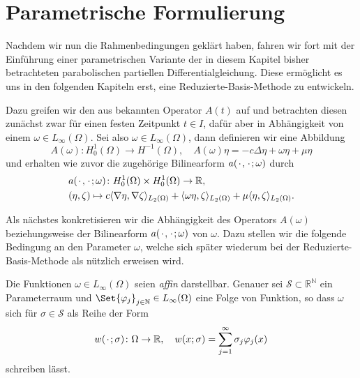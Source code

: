 

\section{Parametrische Formulierung} %
\label{sec:parametrische_formulierung}

Nachdem wir nun die Rahmenbedingungen geklärt haben, fahren wir fort mit der Einführung einer parametrischen Variante der in diesem Kapitel bisher betrachteten parabolischen partiellen Differentialgleichung.
Diese ermöglicht es uns in den folgenden Kapiteln erst, eine Reduzierte-Basis-Methode zu entwickeln.

Dazu greifen wir den aus  bekannten Operator $A(t)$ auf und betrachten diesen zunächst zwar für einen festen Zeitpunkt $t \in I$, dafür aber in Abhängigkeit von einem $\omega \in L_{\infty}(\Omega)$.
Sei also $\omega \in L_{\infty}(\Omega)$, dann definieren wir eine Abbildung
\begin{equation}
    \label{eq:pp:op_a}
    A(\omega) \colon H^{1}_{0}(\Omega) \to H^{-1}(\Omega), \quad A(\omega) \eta = - c \Delta \eta + \omega \eta + \mu \eta
\end{equation}
und erhalten wie zuvor die zugehörige Bilinearform $a({\mkern2mu\cdot\mkern2mu}, {\mkern2mu\cdot\mkern2mu}; \omega)$ durch
\begin{equation}
    \label{eq:pp:bf_a}
    \begin{aligned}
        &a({\mkern2mu\cdot\mkern2mu}, {\mkern2mu\cdot\mkern2mu}; \omega) \colon H^{1}_{0}(\Omega) \times H^{1}_{0}(\Omega) \to \mathbb{R}, \\
        &(\eta, \zeta) \mapsto c\langle\nabla \eta,\nabla \zeta\rangle_{L_{2}(\Omega)} + \langle\omega \eta,\zeta\rangle_{L_{2}(\Omega)} + \mu \langle\eta,\zeta\rangle_{L_{2}(\Omega)}.
    \end{aligned}
\end{equation}

Als nächstes konkretisieren wir die Abhängigkeit des Operators $A(\omega)$ beziehungsweise der Bilinearform $a({\mkern2mu\cdot\mkern2mu}, {\mkern2mu\cdot\mkern2mu}; \omega)$ von $\omega$.
Dazu stellen wir die folgende Bedingung an den Parameter $\omega$, welche sich später wiederum bei der Reduzierte-Basis-Methode als nützlich erweisen wird.

\begin{Definition}
\label{definition:pp:omega_affin}
    Die Funktionen $\omega \in L_{\infty}(\Omega)$ seien \emph{affin} darstellbar.
    Genauer sei $\mathcal S \subset \mathbb{R}^{\mathbb{N}}$ ein Parameterraum und $\Set{ \varphi_{j} }_{j \in \mathbb{N}} \in L_{\infty}(\Omega)$ eine Folge von Funktion, so dass $\omega$ sich für $\sigma \in \mathcal S$ als Reihe der Form
    \begin{equation}
    \label{eq:pp:affine_zerlegung_omega}
        w({\mkern2mu\cdot\mkern2mu}; \sigma) \colon \Omega \to \mathbb{R}, \quad w(x; \sigma) = \sum_{j = 1}^{\infty} \sigma_{j} \varphi_{j}(x)
    \end{equation}
    schreiben lässt.
\end{Definition}

